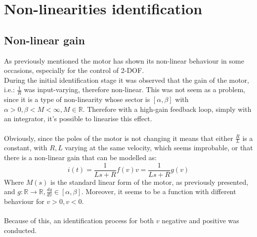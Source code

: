\chapter{Non-linearities identification}

\section{Non-linear gain}
As previously mentioned the motor has shown its non-linear behaviour in some occasions, especially for the control of 2-DOF. \\
During the initial identification stage it was observed that the gain of the motor, i.e.: $\frac{1}{R}$ was input-varying, therefore non-linear. This was not seem as a problem, since it is a type of non-linearity whose sector is $[\alpha, \beta]$ with $\alpha > 0, \beta <M < \infty, M \in \mathbb{R}$. Therefore with a high-gain feedback loop, simply with an integrator, it's possible to linearise this effect. \\ \\
Obviously, since the poles of the motor is not changing  it means that either $\frac{R}{L}$ is a constant, with $R,L$ varying at the same velocity, which seems improbable, or that there is a non-linear gain that can be modelled as:
\begin{equation}
i(t)=\frac{1}{Ls+R} f(v)v = \frac{1}{Ls+R} g(v)
\end{equation}
Where $M(s)$ is the standard linear form of the motor, as previously presented, and $g: \mathbb{R} \to \mathbb{R}, \frac{dg}{dv} \in [\alpha, \beta]$.
Moreover, it seems to be a function with different behaviour for $v>0, v<0$. \\ \\Because of this, an identification process for both $v$ negative and positive was conducted.

